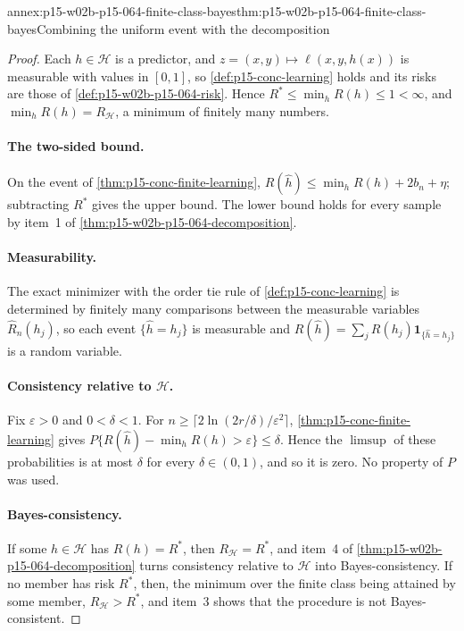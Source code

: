 \begin{annexitem}{annex:p15-w02b-p15-064-finite-class-bayes}{thm:p15-w02b-p15-064-finite-class-bayes}{Combining the uniform event with the decomposition}
\begin{proof}
Each \(h\in\mathcal H\) is a predictor, and
\(z=(x,y)\mapsto\ell(x,y,h(x))\) is measurable with values in \([0,1]\), so
\cref{def:p15-conc-learning} holds and its risks are those of
\cref{def:p15-w02b-p15-064-risk}. Hence
\(R^{*}\leq\min_hR(h)\leq1<\infty\), and \(\min_hR(h)=R_{\mathcal H}\), a
minimum of finitely many numbers.

\paragraph{The two-sided bound.}
On the event of \cref{thm:p15-conc-finite-learning},
\(R(\widehat h)\leq\min_hR(h)+2b_n+\eta\); subtracting \(R^{*}\) gives the
upper bound. The lower bound holds for every sample by item~1 of
\cref{thm:p15-w02b-p15-064-decomposition}.

\paragraph{Measurability.}
The exact minimizer with the order tie rule of
\cref{def:p15-conc-learning} is determined by finitely many comparisons
between the measurable variables \(\widehat R_n(h_j)\), so each event
\(\{\widehat h=h_j\}\) is measurable and
\(R(\widehat h)=\sum_jR(h_j)\mathbf1_{\{\widehat h=h_j\}}\) is a random variable.

\paragraph{Consistency relative to \(\mathcal H\).}
Fix \(\varepsilon>0\) and \(0<\delta<1\). For
\(n\geq\lceil2\ln(2r/\delta)/\varepsilon^2\rceil\),
\cref{thm:p15-conc-finite-learning} gives
\(P\{R(\widehat h)-\min_hR(h)>\varepsilon\}\leq\delta\). Hence the
\(\limsup\) of these probabilities is at most \(\delta\) for every
\(\delta\in(0,1)\), and so it is zero. No property of \(P\) was used.

\paragraph{Bayes-consistency.}
If some \(h\in\mathcal H\) has \(R(h)=R^{*}\), then
\(R_{\mathcal H}=R^{*}\), and item~4 of
\cref{thm:p15-w02b-p15-064-decomposition} turns consistency relative to
\(\mathcal H\) into Bayes-consistency. If no member has risk \(R^{*}\), then,
the minimum over the finite class being attained by some member,
\(R_{\mathcal H}>R^{*}\), and item~3 shows that the procedure is not
Bayes-consistent.
\end{proof}
\end{annexitem}

